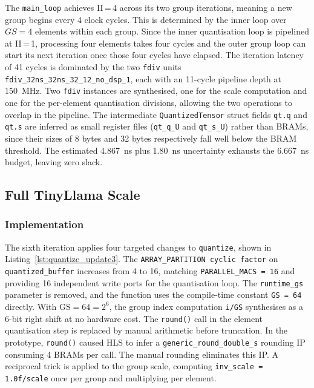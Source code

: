 The \texttt{main\_loop} achieves II\,=\,4 across its two group
iterations, meaning a new group begins every 4 clock cycles. This is
determined by the inner loop over $GS = 4$ elements within each group.
Since the inner quantisation loop is pipelined at II\,=\,1, processing
four elements takes four cycles and the outer group loop can start its
next iteration once those four cycles have elapsed. The iteration latency
of 41 cycles is dominated by the two \texttt{fdiv} units
\texttt{fdiv\_32ns\_32ns\_32\_12\_no\_dsp\_1}, each with an
11-cycle pipeline depth at \SI{150}{\mega\hertz}. Two \texttt{fdiv}
instances are synthesised, one for the scale computation and one for the
per-element quantisation divisions, allowing the two operations to
overlap in the pipeline. The intermediate \texttt{QuantizedTensor} struct
fields \texttt{qt.q} and \texttt{qt.s} are inferred as small register
files (\texttt{qt\_q\_U} and \texttt{qt\_s\_U}) rather than BRAMs, since
their sizes of 8 bytes and 32 bytes respectively fall well below the
BRAM threshold. The estimated \SI{4.867}{\nano\second} plus \SI{1.80}{\nano\second}
uncertainty exhausts the \SI{6.667}{\nano\second} budget,
leaving zero slack.


\subsection{Full TinyLlama Scale}
\label{subsec:quantize_update3}

\subsubsection{Implementation}
\label{subsubsec:quantize_update3_impl}

The sixth iteration applies four targeted changes to \texttt{quantize},
shown in Listing~\ref{lst:quantize_update3}. The
\texttt{ARRAY\_PARTITION cyclic factor} on \texttt{quantized\_buffer}
increases from 4 to 16, matching \texttt{PARALLEL\_MACS\,=\,16} and
providing 16 independent write ports for the quantisation loop.
The \texttt{runtime\_gs} parameter is removed, and the function uses the
compile-time constant \texttt{GS\,=\,64} directly. With
$\text{GS} = 64 = 2^6$, the group index computation \texttt{i/GS}
synthesises as a 6-bit right shift at no hardware cost. The
\texttt{round()} call in the element quantisation step is replaced by
manual arithmetic before truncation. In the prototype,
\texttt{round()} caused HLS to infer a
\texttt{generic\_round\_double\_s} rounding IP consuming 4 BRAMs per
call. The manual rounding eliminates this IP. A reciprocal trick is
applied to the group scale, computing \texttt{inv\_scale =
1.0f/scale} once per group and multiplying per element.

